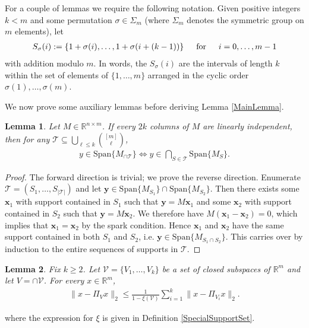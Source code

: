 \documentclass[journal, onecolumn]{IEEEtran}
\newtheorem{lemma}{Lemma}
\begin{document}
For a couple of lemmas we require the following notation. Given positive integers $k < m$ and some permutation $\sigma \in \Sigma_m$ (where $\Sigma_m$ denotes the symmetric group on $m$ elements), let
\begin{align}
S_\sigma(i) := \{1+\sigma(i), \ldots, 1+\sigma(i + (k-1)) \} \indent \text{for} \indent i = 0, \ldots, m-1
\end{align}
%
with addition modulo $m$. In words, the $S_\sigma(i)$ are the intervals of length $k$ within the set of elements of $\{1, \ldots, m\}$ arranged in the cyclic order $\sigma(1), \ldots, \sigma(m)$.

We now prove some auxiliary lemmas before deriving Lemma \ref{MainLemma}.


\begin{lemma}\label{SpanIntersectionLemma}
Let $M \in \mathbb{R}^{n \times m}$. If every $2k$ columns of $M$ are linearly independent, then for any $\mathcal{T} \subseteq \bigcup_{\ell \leq k} {[m] \choose \ell}$,
\begin{align}
y \in \text{Span}\{M_{\cap \mathcal{T}}\}  \Longleftrightarrow y \in \bigcap_{S \in \mathcal{T}} \text{Span}\{M_S\}.
\end{align}
\end{lemma}

\begin{proof}The forward direction is trivial; we prove the reverse direction. Enumerate $\mathcal{T} = (S_1, \ldots, S_{|\mathcal{T}|})$ and let $\mathbf{y} \in \text{Span}\{M_{S_1}\} \cap \text{Span}\{M_{S_2}\}$. Then there exists some $\mathbf{x}_1$ with support contained in $S_1$ such that $\mathbf{y} = M\mathbf{x}_1$ and some $\mathbf{x}_2$ with support contained in $S_2$ such that $\mathbf{y} = M\mathbf{x}_2$. We therefore have $M(\mathbf{x}_1 - \mathbf{x}_2) = 0$, which implies that $\mathbf{x}_1 = \mathbf{x}_2$ by the spark condition. Hence $\mathbf{x}_1$ and $\mathbf{x}_2$ have the same support contained in both $S_1$ and $S_2$, i.e. $\mathbf{y} \in \text{Span}\{M_{S_1 \cap S_2}\}$. This carries over by induction to the entire sequences of supports in $\mathcal{T}$. 
\end{proof}


\begin{lemma}\label{DistanceToIntersectionLemma}
Fix $k \geq 2$. Let $\mathcal{V} = \{V_1, \ldots, V_k\}$ be a set of closed subspaces of $\mathbb{R}^m$ and let $V = \cap \mathcal{V}$. For every $x \in \mathbb{R}^m$,
\begin{align}\label{DTILeq}
\|x - \Pi_V x\|_2 \leq \frac{1}{1 - \xi(\mathcal{V})} \sum_{i=1}^k \|x - \Pi_{V_i} x\|_2.
\end{align}
\end{lemma}
%
where the expression for $\xi$ is given in Definition \ref{SpecialSupportSet}.
\end{document}
